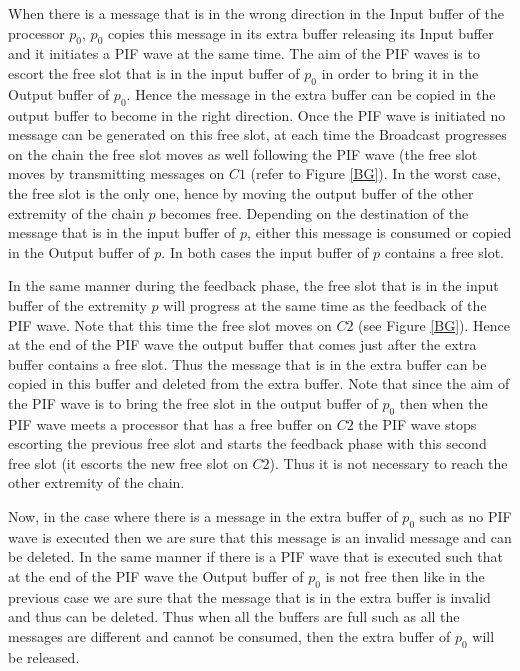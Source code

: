\documentclass{llncs}
\begin{document}
When there is a message that is in the wrong direction in the Input buffer of the processor $p_{0}$, $p_{0}$ copies
this message in its extra buffer releasing its Input buffer and it initiates a PIF wave at the same time. The aim of
the PIF waves is to escort the free slot that is in the input buffer of $p_{0}$ in order to bring it in the Output
buffer of $p_{0}$. Hence the message in the extra buffer can be copied in the output buffer to become in the right
direction. Once the PIF wave is initiated no message can be generated on this free slot, at each time the Broadcast
progresses on the chain the free slot moves as well following the PIF wave (the free slot moves by transmitting
messages on $C1$ (refer to Figure \ref{BG}). In the worst case, the free slot is the only one, hence by moving the
output buffer of the other extremity of the chain $p$ becomes free. Depending on the destination of the message that
is in the input buffer of $p$, either this message is consumed or copied in the Output buffer of $p$. In both cases
the input buffer of $p$ contains a free slot.

 In the same manner during the feedback phase, the free slot that is in the input buffer of the extremity $p$ will
progress at the same time as the feedback of the PIF wave. Note that this time the free slot moves on $C2$ (see Figure
\ref{BG}). Hence at the end of the PIF wave the output buffer that comes just after the extra buffer contains a free
slot. Thus the message that is in the extra buffer can be copied in this buffer and deleted from the extra buffer.
Note that since the aim of the PIF wave is to bring the free slot in the output buffer of $p_{0}$ then when the PIF
wave meets a processor that has a free buffer on $C2$ the PIF wave stops escorting the previous free slot and starts
the feedback phase with this second free slot (it escorts the new free slot on $C2$). Thus it is not necessary to
reach the other extremity of the chain.





Now, in the case where there is a message in the extra buffer of $p_{0}$ such as no PIF wave is executed then we are
sure that this message is an invalid message and can be deleted. In the same manner if there is a PIF wave that is
executed such that at the end of the PIF wave the Output buffer of $p_{0}$ is not free then like in the previous case
we are sure that the message that is in the extra buffer is invalid and thus can be deleted. Thus when all the buffers are full such as all the messages are different and cannot be consumed, then the extra buffer of $p_{0}$ will be released. 
\end{document}
